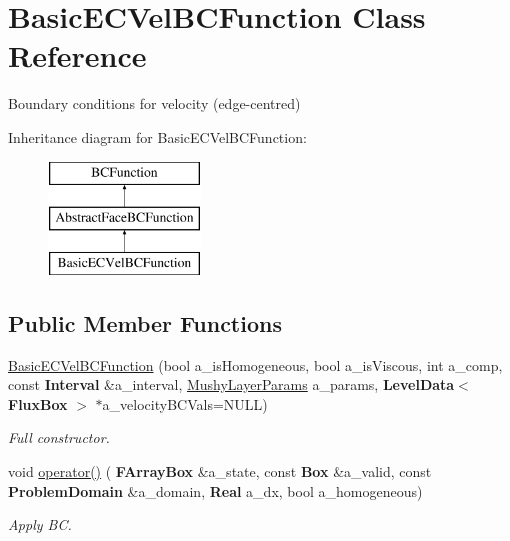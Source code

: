 \hypertarget{class_basic_e_c_vel_b_c_function}{}\section{Basic\+E\+C\+Vel\+B\+C\+Function Class Reference}
\label{class_basic_e_c_vel_b_c_function}


Boundary conditions for velocity (edge-\/centred)  


Inheritance diagram for Basic\+E\+C\+Vel\+B\+C\+Function\+:\begin{figure}[H]
\begin{center}
\leavevmode
\includegraphics[height=3.000000cm]{class_basic_e_c_vel_b_c_function}
\end{center}
\end{figure}
\subsection*{Public Member Functions}
\begin{DoxyCompactItemize}
\item 
\mbox{\label{class_basic_e_c_vel_b_c_function_ae85b8fce28782e8a5a331fde0116356b}} 
\hyperlink{class_basic_e_c_vel_b_c_function_ae85b8fce28782e8a5a331fde0116356b}{Basic\+E\+C\+Vel\+B\+C\+Function} (bool a\+\_\+is\+Homogeneous, bool a\+\_\+is\+Viscous, int a\+\_\+comp, const \textbf{ Interval} \&a\+\_\+interval, \hyperlink{class_mushy_layer_params}{Mushy\+Layer\+Params} a\+\_\+params, \textbf{ Level\+Data}$<$ \textbf{ Flux\+Box} $>$ $\ast$a\+\_\+velocity\+B\+C\+Vals=N\+U\+LL)
\begin{DoxyCompactList}\small\item\em Full constructor. \end{DoxyCompactList}\item 
\mbox{\label{class_basic_e_c_vel_b_c_function_a4dc48ed586c036b77c1b85efbdfc4f92}} 
void \hyperlink{class_basic_e_c_vel_b_c_function_a4dc48ed586c036b77c1b85efbdfc4f92}{operator()} (\textbf{ F\+Array\+Box} \&a\+\_\+state, const \textbf{ Box} \&a\+\_\+valid, const \textbf{ Problem\+Domain} \&a\+\_\+domain, \textbf{ Real} a\+\_\+dx, bool a\+\_\+homogeneous)
\begin{DoxyCompactList}\small\item\em Apply BC. \end{DoxyCompactList}\end{DoxyCompactItemize}
